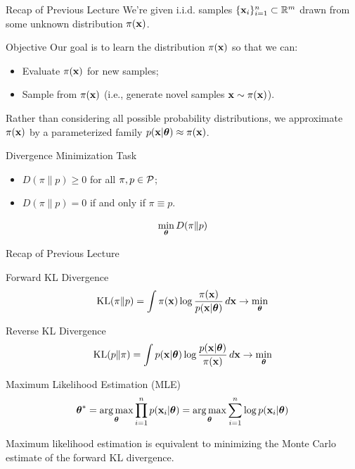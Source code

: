 \documentclass{beamer}
\begin{document}
\begin{frame}
\titlepage
\resetonslide
\end{frame}
\begin{frame}{Recap of Previous Lecture}
	We're given i.i.d. samples $\{\mathbf{x}_i\}_{i=1}^n \subset \mathbb{R}^m$ drawn from some unknown distribution $\pi(\mathbf{x})$.

	\begin{block}{Objective}
		Our goal is to learn the distribution $\pi(\mathbf{x})$ so that we can:
		\begin{itemize}
		    \item Evaluate $\pi(\mathbf{x})$ for new samples;
		    \item Sample from $\pi(\mathbf{x})$ (i.e., generate novel samples $\mathbf{x} \sim \pi(\mathbf{x})$).
		\end{itemize}
	\end{block}
	Rather than considering all possible probability distributions, we approximate $\pi(\mathbf{x})$ by a parameterized family $p(\mathbf{x} | \boldsymbol{\theta}) \approx \pi(\mathbf{x})$.

	\begin{block}{Divergence Minimization Task}
		\begin{itemize}
			\item $D(\pi \| p) \geq 0$ for all $\pi, p \in \mathcal{P}$;
			\item $D(\pi \| p) = 0$ if and only if $\pi \equiv p$.
		\end{itemize}
		\[
		\min_{\boldsymbol{\theta}} D(\pi \| p)
		\]
	\end{block}
\end{frame}
\begin{frame}{Recap of Previous Lecture}
	\begin{block}{Forward KL Divergence}
		\vspace{-0.2cm}
		\[
		\mathrm{KL}(\pi \| p) = \int \pi (\mathbf{x}) \log \frac{\pi(\mathbf{x})}{p(\mathbf{x} | \boldsymbol{\theta})}\, d \mathbf{x} \rightarrow \min_{\boldsymbol{\theta}}
		\]
	\end{block}
	\begin{block}{Reverse KL Divergence}
		\vspace{-0.2cm}
		\[
		\mathrm{KL}(p \| \pi) = \int p (\mathbf{x}| \boldsymbol{\theta}) \log \frac{p(\mathbf{x}| \boldsymbol{\theta})}{\pi(\mathbf{x})}\, d \mathbf{x} \rightarrow \min_{\boldsymbol{\theta}}
		\]
	\end{block}
	
	\begin{block}{Maximum Likelihood Estimation (MLE)}
		\vspace{-0.3cm}
		\[
		\boldsymbol{\theta}^* = \operatorname*{arg\,max}_{\boldsymbol{\theta}} \prod_{i=1}^n p(\mathbf{x}_i | \boldsymbol{\theta}) = \operatorname*{arg\,max}_{\boldsymbol{\theta}} \sum_{i=1}^n \log p(\mathbf{x}_i | \boldsymbol{\theta})
		\]
		\vspace{-0.1cm}
	\end{block}
	Maximum likelihood estimation is equivalent to minimizing the Monte Carlo estimate of the forward KL divergence.
\end{frame}
\end{document}
